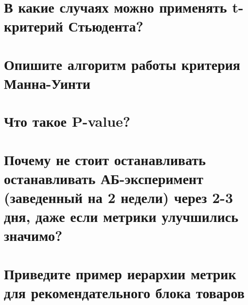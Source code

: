 \documentclass[14pt]{extarticle}
\begin{document}
	\newpage
	
	\section{В какие случаях можно применять t-критерий Стьюдента?} 
	
	
	\newpage
	
	\section{Опишите алгоритм работы критерия Манна-Уинти} 
	
	
	\newpage
	
	\section{Что такое P-value?} 
	
	
	\newpage
	
	\section{Почему не стоит останавливать останавливать АБ-эксперимент (заведенный на 2 недели) через 2-3 дня, даже если метрики улучшились значимо?} 
	
	
	\newpage
	
	\section{Приведите пример иерархии метрик для рекомендательного блока товаров} 
	
	
	\newpage
\end{document}
